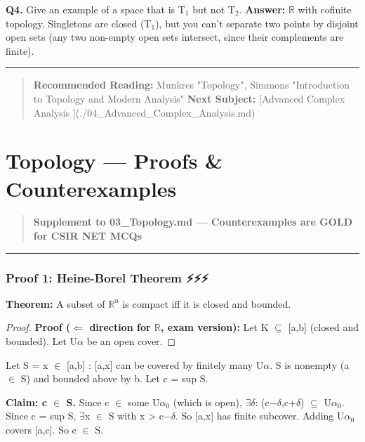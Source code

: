 \documentclass[12pt,a4paper,openany]{book}
\begin{document}
{{\textbf{Q4.} Give an example of a space that is T$_1$ but not T$_2$.
\textbf{Answer:} $\mathbb{R}$ with cofinite topology. Singletons are closed (T$_1$), but you can't separate two points by disjoint open sets (any two non-empty open sets intersect, since their complements are finite).

\bigskip\noindent\rule{\textwidth}{0.4pt}\bigskip

\begin{quote}
\textbf{ Recommended Reading:} Munkres "Topology", Simmons "Introduction to Topology and Modern Analysis"
\textbf{Next Subject:} [Advanced Complex Analysis ](./04_Advanced_Complex_Analysis.md)
\end{quote}

\newpage

\chapter{Topology --- Proofs \& Counterexamples}


\begin{quote}
\textbf{Supplement to 03_Topology.md — Counterexamples are GOLD for CSIR NET MCQs}
\end{quote}

\bigskip\noindent\rule{\textwidth}{0.4pt}\bigskip


\subsection{Proof 1: Heine-Borel Theorem ⚡⚡⚡}

\begin{tcolorbox}[colback=lightblue,colframe=thmblue,title=\textbf{Theorem},breakable,boxrule=1.5pt]
\textbf{Theorem:} A subset of $\mathbb{R}^n$ is compact iff it is closed and bounded.
\end{tcolorbox}

\begin{proof}
\textbf{Proof ($\Longleftarrow$ direction for $\mathbb{R}$, exam version):}
Let K $\subseteq$ [a,b] (closed and bounded). Let {U$\alpha$} be an open cover.
\end{proof}

Let S = {x $\in$ [a,b] : [a,x] can be covered by finitely many U$\alpha$}.
S is nonempty (a $\in$ S) and bounded above by b. Let c = sup S.

\textbf{Claim: c $\in$ S.} Since c $\in$ some U$\alpha_0$ (which is open), $\exists\delta$: (c−$\delta$,c+$\delta$) $\subseteq$ U$\alpha_0$. Since c = sup S, $\exists$x $\in$ S with x > c−$\delta$. So [a,x] has finite subcover. Adding U$\alpha_0$ covers [a,c]. So c $\in$ S. 

}}
\end{document}
